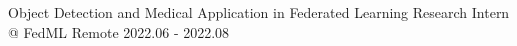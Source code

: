 



\begin{cventries}

\cventry
{Object Detection and Medical Application in Federated Learning} %
{Research Intern @ FedML} %
{Remote} %
{2022.06 - 2022.08} %
{
}
    


\end{cventries}
